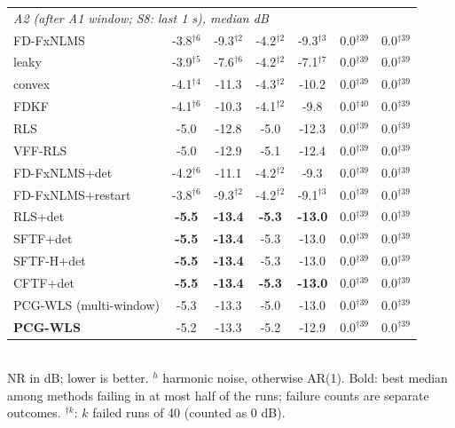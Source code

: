 \begin{table}[t]
{\begin{tabular}{lcccccc}
\midrule
\multicolumn{7}{l}{\emph{A2 (after A1 window; S8: last 1 s), median dB}}\\
FD-FxNLMS & -3.8$^{\dagger6}$ & -9.3$^{\dagger2}$ & -4.2$^{\dagger2}$ & -9.3$^{\dagger3}$ & 0.0$^{\dagger39}$ & 0.0$^{\dagger39}$ \\
leaky & -3.9$^{\dagger5}$ & -7.6$^{\dagger6}$ & -4.2$^{\dagger2}$ & -7.1$^{\dagger7}$ & 0.0$^{\dagger39}$ & 0.0$^{\dagger39}$ \\
convex & -4.1$^{\dagger4}$ & -11.3 & -4.3$^{\dagger2}$ & -10.2 & 0.0$^{\dagger39}$ & 0.0$^{\dagger39}$ \\
FDKF & -4.1$^{\dagger6}$ & -10.3 & -4.1$^{\dagger2}$ & -9.8 & 0.0$^{\dagger40}$ & 0.0$^{\dagger39}$ \\
RLS & -5.0 & -12.8 & -5.0 & -12.3 & 0.0$^{\dagger39}$ & 0.0$^{\dagger39}$ \\
VFF-RLS & -5.0 & -12.9 & -5.1 & -12.4 & 0.0$^{\dagger39}$ & 0.0$^{\dagger39}$ \\
FD-FxNLMS+det & -4.2$^{\dagger6}$ & -11.1 & -4.2$^{\dagger2}$ & -9.3 & 0.0$^{\dagger39}$ & 0.0$^{\dagger39}$ \\
FD-FxNLMS+restart & -3.8$^{\dagger6}$ & -9.3$^{\dagger2}$ & -4.2$^{\dagger2}$ & -9.1$^{\dagger3}$ & 0.0$^{\dagger39}$ & 0.0$^{\dagger39}$ \\
RLS+det & \textbf{-5.5} & \textbf{-13.4} & \textbf{-5.3} & \textbf{-13.0} & 0.0$^{\dagger39}$ & 0.0$^{\dagger39}$ \\
SFTF+det & \textbf{-5.5} & \textbf{-13.4} & -5.3 & -13.0 & 0.0$^{\dagger39}$ & 0.0$^{\dagger39}$ \\
SFTF-H+det & \textbf{-5.5} & \textbf{-13.4} & -5.3 & -13.0 & 0.0$^{\dagger39}$ & 0.0$^{\dagger39}$ \\
CFTF+det & \textbf{-5.5} & \textbf{-13.4} & \textbf{-5.3} & \textbf{-13.0} & 0.0$^{\dagger39}$ & 0.0$^{\dagger39}$ \\
PCG-WLS (multi-window) & -5.3 & -13.3 & -5.0 & -13.0 & 0.0$^{\dagger39}$ & 0.0$^{\dagger39}$ \\
\textbf{PCG-WLS} & -5.2 & -13.3 & -5.2 & -12.9 & 0.0$^{\dagger39}$ & 0.0$^{\dagger39}$ \\
\bottomrule
\end{tabular}}
\\[2pt]{\scriptsize NR in dB; lower is better. $^h$ harmonic noise, otherwise AR(1). Bold: best median among methods failing in at most half of the runs; failure counts are separate outcomes. $^{\dagger k}$: $k$ failed runs of 40 (counted as 0 dB).}
\end{table}
